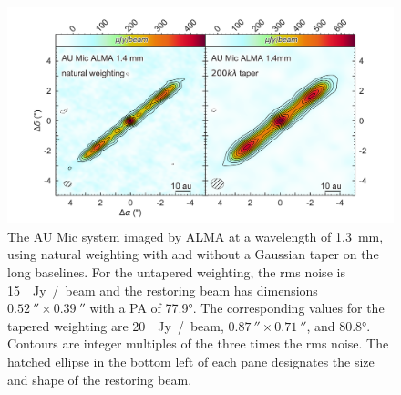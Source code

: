 \documentclass[modern]{aastex62}
\begin{document}
\begin{figure}
  \includegraphics[width=\linewidth]{../figures/aumic_imaged}
  \caption{The AU Mic system imaged by ALMA at a wavelength of \SI{1.3}{mm}, using natural weighting with and without a Gaussian taper on the long baselines. 
  For the untapered weighting, the rms noise is \SI{15}{\mu Jy / beam} and the restoring beam has dimensions $\SI{0.52}{\arcsecond} \times \SI{0.39}{\arcsecond}$ with a PA of \ang[angle-symbol-over-decimal]{77.9}.
  The corresponding values for the tapered weighting are \SI{20}{\mu Jy / beam}, $\SI{0.87}{\arcsecond} \times \SI{0.71}{\arcsecond}$, and \ang[angle-symbol-over-decimal]{80.8}. 
  Contours are integer multiples of the three times the rms noise.
  The hatched ellipse in the bottom left of each pane designates the size and shape of the restoring beam.
  }
  \label{fig: aumic_imaged}
\end{figure}
\end{document}
